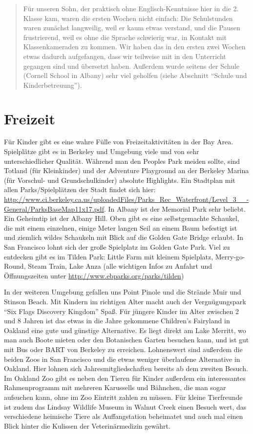 \documentclass[a4paper]{scrreprt}
\begin{document}
\begin{verse}
Für unseren Sohn, der praktisch ohne Englisch-Kenntnisse hier in die 2. Klasse kam, waren die ersten Wochen nicht einfach: Die Schulstunden waren zunächst langweilig, weil er kaum etwas verstand, und die Pausen frustrierend, weil es ohne die Sprache schwierig war, in Kontakt mit Klassenkameraden zu kommen. Wir haben das in den ersten zwei Wochen etwas dadurch aufgefangen, dass wir teilweise mit in den Unterricht gegangen sind und übersetzt haben. Außerdem wurde seitens der Schule (Cornell School in Albany) sehr viel geholfen (siehe Abschnitt "`Schule und Kinderbetreuung"').
\end{verse}

\section{Freizeit}

Für Kinder gibt es eine wahre Fülle von Freizeitaktivitäten in der Bay Area. Spielplätze gibt es in Berkeley und Umgebung viele und von sehr unterschiedlicher Qualität. Während man den Peoples Park meiden sollte, sind Totland (für Kleinkinder) und der Adventure Playground an der Berkeley Marina (für Vorschul- und Grundschulkinder) absolute Highlights. 
Ein Stadtplan mit allen Parks/Spielplätzen der Stadt findet sich hier: \url{http://www.ci.berkeley.ca.us/uploadedFiles/Parks\_Rec\_Waterfront/Level\_3\_\_-General/ParksBaseMap11x17.pdf}.
In Albany ist der Memorial Park sehr beliebt. Ein Geheimtip ist der Albany Hill. Oben gibt es eine selbstgemachte Schaukel, die mit einem einzelnen, einige Meter langen Seil an einem Baum befestigt ist und ziemlich wildes Schaukeln mit Blick auf die Golden Gate Bridge erlaubt. In San Francisco lohnt sich der große Spielplatz im Golden Gate Park. Viel zu entdecken gibt es im Tilden Park:
Little Farm mit kleinem Spielplatz, Merry-go-Round, Steam Train, Lake Anza (alle wichtigen Infos zu Anfahrt und Öffnungszeiten unter \url{http://www.ebparks.org/parks/tilden})

In der weiteren Umgebung gefallen uns Point Pinole und die Strände Muir und Stinson Beach. Mit Kindern im richtigen Alter macht auch der Vergnügungspark "`Six Flags Discovery Kingdom"' Spaß.
Für jüngere Kinder im Alter zwischen 2 und 8 Jahren ist das etwas in die Jahre gekommene Children's Fairyland in Oakland eine gute und günstige Alternative. Es liegt direkt am Lake Merritt, wo man auch Boote mieten oder den Botanischen Garten besuchen kann, und ist gut mit Bus oder BART von Berkeley zu erreichen.
Lohnenswert sind außerdem die beiden Zoos in San Francisco und die etwas weniger überlaufene Alternative in Oakland. Hier lohnen sich Jahresmitgliedschaften bereits ab dem zweiten Besuch. Im Oakland Zoo gibt es neben den Tieren für Kinder außerdem ein interessantes Rahmenprogramm mit mehreren Karussells und Bähnchen, die man sogar aufsuchen kann, ohne im Zoo Eintritt zahlen zu müssen. Für kleine Tierfreunde ist zudem das Lindsay Wildlife Museum in Walnut Creek einen Besuch wert, das verschiedene heimische Tiere als Auffangstation beheimatet und auch mal einen Blick hinter die Kulissen der Veterinärmedizin gewährt.
\end{document}
